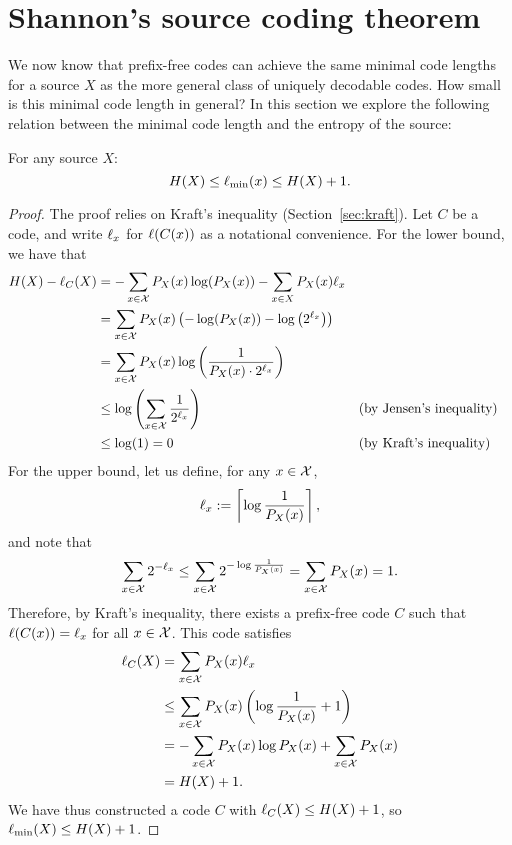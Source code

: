 \section{Shannon's source coding theorem}
We now know that prefix-free codes can achieve the same minimal code lengths for a source $X$ as the more general class of uniquely decodable codes. How small is this minimal code length in general? In this section we explore the following relation between the minimal code length and the entropy of the source:
\begin{theorem}
For any source $X$:
\[
H(X) \leq \ell_{\min}(x) \leq H(X) + 1.
\]
\end{theorem}
\begin{proof}
The proof relies on Kraft's inequality (Section~\ref{sec:kraft}). Let $C$ be a code, and write $\ell_x$ for $\ell(C(x))$ as a notational convenience. For the lower bound, we have that
\begin{align}
H(X) - \ell_C(X) &= - \sum_{x \in {\cal X}} P_X(x) \log(P_X(x)) - \sum_{x \in X} P_X(x) \ell_x\nonumber\\
&=  \sum_{x \in {\cal X}} P_X(x) \left(-\log(P_X(x)) - \log\left(2^{\ell_x}\right)\right)\nonumber\\
&=  \sum_{x \in {\cal X}} P_X(x) \log \left(\frac{1}{P_X(x)\cdot 2^{\ell_x}}\right)\nonumber\\
&\leq \log\left(\sum_{x \in {\cal X}} \frac{1}{2^{\ell_x}}\right) &&\mbox{(by Jensen's inequality)}\nonumber\\
&\leq \log(1) = 0&&\mbox{(by Kraft's inequality)}
\end{align}
For the upper bound, let us define, for any $x \in {\cal X}$,
\begin{align}
\ell_x := \left\lceil\log\frac{1}{P_X(x)}\right\rceil,
\end{align}
and note that
\begin{align}
\sum_{x \in {\cal X}} 2^{-\ell_x} \leq \sum_{x \in {\cal X}} 2^{-\log\frac{1}{P_X(x)}} = \sum_{x \in {\cal X}} P_X(x) = 1.
\end{align}
Therefore, by Kraft's inequality, there exists a prefix-free code $C$ such that $\ell(C(x)) = \ell_x$ for all $x \in {\cal X}$. This code satisfies
\begin{align}
\ell_C(X) &= \sum_{x \in {\cal X}} P_X(x) \ell_x \nonumber\\
&\leq \sum_{x \in {\cal X}} P_X(x) \left(\log \frac{1}{P_X(x)} + 1 \right)\nonumber\\
&= -\sum_{x \in {\cal X}} P_X(x)\log P_X(x) + \sum_{x \in {\cal X}} P_X(x) \nonumber\\
&= H(X) + 1.
\end{align}
We have thus constructed a code $C$ with $\ell_C(X) \leq H(X) + 1$, so $\ell_{\min}(X) \leq H(X) + 1$.
\end{proof}

